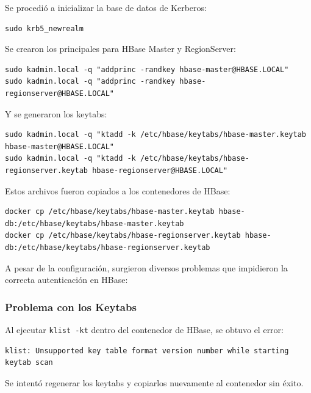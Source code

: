 \documentclass{article}
\begin{document}
Se procedió a inicializar la base de datos de Kerberos:

\begin{lstlisting}[style=bashStyle]
sudo krb5_newrealm
\end{lstlisting}

\newpage
Se crearon los principales para HBase Master y RegionServer:

\begin{lstlisting}[style=bashStyle]
sudo kadmin.local -q "addprinc -randkey hbase-master@HBASE.LOCAL"
sudo kadmin.local -q "addprinc -randkey hbase-regionserver@HBASE.LOCAL"
\end{lstlisting}


Y se generaron los keytabs:

\begin{lstlisting}[style=bashStyle]
sudo kadmin.local -q "ktadd -k /etc/hbase/keytabs/hbase-master.keytab hbase-master@HBASE.LOCAL"
sudo kadmin.local -q "ktadd -k /etc/hbase/keytabs/hbase-regionserver.keytab hbase-regionserver@HBASE.LOCAL"
\end{lstlisting}

Estos archivos fueron copiados a los contenedores de HBase:

\begin{lstlisting}[style=bashStyle]
docker cp /etc/hbase/keytabs/hbase-master.keytab hbase-db:/etc/hbase/keytabs/hbase-master.keytab
docker cp /etc/hbase/keytabs/hbase-regionserver.keytab hbase-db:/etc/hbase/keytabs/hbase-regionserver.keytab
\end{lstlisting}

A pesar de la configuración, surgieron diversos problemas que impidieron la correcta autenticación en HBase:

\vspace{5mm}

\subsubsection{Problema con los Keytabs}

Al ejecutar \texttt{klist -kt} dentro del contenedor de HBase, se obtuvo el error:

\begin{lstlisting}[style=bashStyle]
klist: Unsupported key table format version number while starting keytab scan
\end{lstlisting}


Se intentó regenerar los keytabs y copiarlos nuevamente al contenedor sin éxito.
\end{document}
